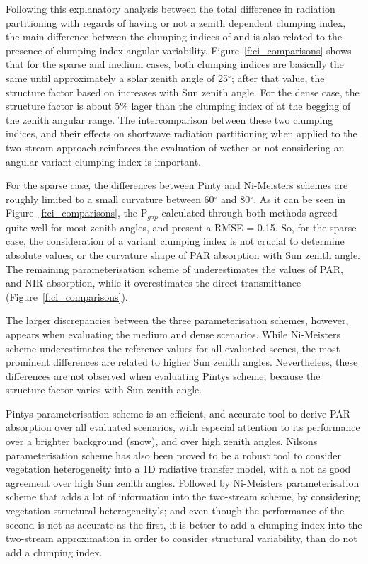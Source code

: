 \documentclass[a4paper,11pt]{report}
\begin{document}
Following this explanatory analysis between the total difference in radiation partitioning with regards of having or not a zenith dependent clumping index, the main difference between the clumping indices of \citet{pinty2006} and \citet{Ni-Meister2010} is also related to the presence of clumping index angular variability. Figure~\ref{f:ci_comparisons} shows that for the sparse and medium cases, both clumping indices are basically the same until approximately a solar zenith angle of 25$^{\circ}$; after that value, the structure factor based on \citet{pinty2006} increases with Sun zenith angle. For the dense case, the structure factor is about 5\% lager than the clumping index of \citet{Ni-Meister2010} at the begging of the zenith angular range. The intercomparison between these two clumping indices, and their effects on shortwave radiation partitioning when applied to the two-stream approach reinforces the evaluation of wether or not considering an angular variant clumping index is important. 

For the sparse case, the differences between Pinty and Ni-Meister\textquotesingle s schemes are roughly limited to a small curvature between 60$^{\circ}$ and 80$^{\circ}$. As it can be seen in Figure~\ref{f:ci_comparisons}, the P$_{gap}$ calculated through both methods agreed quite well for most zenith angles, and present a RMSE = 0.15. So, for the sparse case, the consideration of a variant clumping index is not crucial to determine absolute values, or the curvature shape of PAR absorption with Sun zenith angle. The remaining parameterisation scheme of \citet{Kucharik1999} underestimates the values of PAR, and NIR absorption, while it overestimates the direct transmittance (Figure~\ref{f:ci_comparisons}).

The larger discrepancies between the three parameterisation schemes, however, appears when evaluating the medium and dense scenarios. While Ni-Meister\textquotesingle s scheme underestimates the reference values for all evaluated scenes, the most prominent differences are related to higher Sun zenith angles. Nevertheless, these differences are not observed when evaluating Pinty\textquotesingle s scheme, because the structure factor varies with Sun zenith angle.

Pinty\textquotesingle s parameterisation scheme is an efficient, and accurate tool to derive PAR absorption over all evaluated scenarios, with especial attention to its performance over a brighter background (snow), and over high zenith angles. Nilson\textquotesingle s parameterisation scheme has also been proved to be a robust tool to consider vegetation heterogeneity into a 1D radiative transfer model, with a not as good agreement over high Sun zenith angles. Followed by Ni-Meister\textquotesingle s parameterisation scheme that adds a lot of information into the two-stream scheme, by considering vegetation structural heterogeneity's; and even though the performance of the second is not as accurate as the first, it is better to add a clumping index into the two-stream approximation in order to consider structural variability, than do not add a clumping index. 
\end{document}
